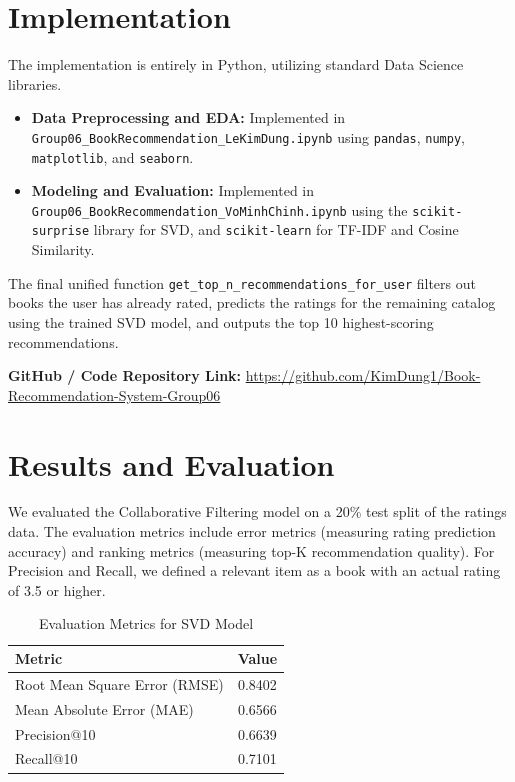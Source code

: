 \documentclass[12pt]{article}
\begin{document}
\section{Implementation}
The implementation is entirely in Python, utilizing standard Data Science libraries.
\begin{itemize}
    \item \textbf{Data Preprocessing and EDA:} Implemented in \texttt{Group06\_BookRecommendation\_LeKimDung.ipynb} using \texttt{pandas}, \texttt{numpy}, \texttt{matplotlib}, and \texttt{seaborn}.
    \item \textbf{Modeling and Evaluation:} Implemented in \texttt{Group06\_BookRecommendation\_VoMinhChinh.ipynb} using the \texttt{scikit-surprise} library for SVD, and \texttt{scikit-learn} for TF-IDF and Cosine Similarity.
\end{itemize}
The final unified function \texttt{get\_top\_n\_recommendations\_for\_user} filters out books the user has already rated, predicts the ratings for the remaining catalog using the trained SVD model, and outputs the top 10 highest-scoring recommendations.

\textbf{GitHub / Code Repository Link:} \url{https://github.com/KimDung1/Book-Recommendation-System-Group06}

\section{Results and Evaluation}
We evaluated the Collaborative Filtering model on a 20\% test split of the ratings data. The evaluation metrics include error metrics (measuring rating prediction accuracy) and ranking metrics (measuring top-K recommendation quality). For Precision and Recall, we defined a relevant item as a book with an actual rating of 3.5 or higher.

\begin{table}[h]
\centering
\begin{tabular}{lc}
\toprule
\textbf{Metric} & \textbf{Value} \\
\midrule
Root Mean Square Error (RMSE) & 0.8402 \\
Mean Absolute Error (MAE) & 0.6566 \\
Precision@10 & 0.6639 \\
Recall@10 & 0.7101 \\
\bottomrule
\end{tabular}
\caption{Evaluation Metrics for SVD Model}
\end{table}
\end{document}
